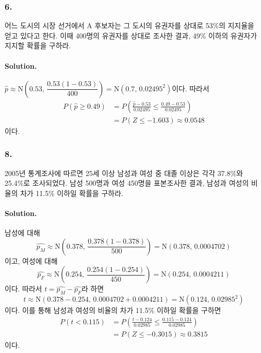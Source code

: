 \subsubsection{6.} 어느 도시의 시장 선거에서 A 후보자는 그 도시의 유권자를 상대로 53\%의 지지율을 얻고 있다고 한다.
이때 400명의 유권자를 상대로 조사한 결과, 49\% 이하의 유권자가 지지할 확률을 구하라.

\paragraph{Solution.} $\hat{p} \approx \mathrm{N}\left(0.53,\,\dfrac{0.53\left(1-0.53\right)}{400}\right) = \mathrm{N}\left(0.7,\,0.02495^2\right)$이다.
따라서
\begin{align*}
    P\left(\hat{p}\geq 0.49\right) &= P\left(\frac{\hat{p}-0.53}{0.02495} \leq \frac{0.49-0.53}{0.02495}\right) \\
    &= P\left(Z \leq -1.603\right) \approx 0.0548
\end{align*}
이다.

\subsubsection{8.} 2005년 통계조사에 따르면 25세 이상 남성과 여성 중 대졸 이상은 각각 37.8\%와 25.4\%로 조사되었다.
남성 500명과 여성 450명을 표본조사한 결과, 남성과 여성의 비율의 차가 11.5\% 이하일 확률을 구하라.

\paragraph{Solution.} 남성에 대해
\[\hat{p_M} \approx \mathrm{N}\left(0.378,\,\dfrac{0.378\left(1-0.378\right)}{500}\right) = \mathrm{N}\left(0.378,\,0.0004702\right)\]
이고, 여성에 대해
\[\hat{p_F} \approx \mathrm{N}\left(0.254,\,\dfrac{0.254\left(1-0.254\right)}{450}\right) = \mathrm{N}\left(0.254,\,0.0004211\right)\]
이다. 따라서 $t=\hat{p_M}-\hat{p_F}$라 하면
\[t \approx \mathrm{N}\left(0.378-0.254,\,0.0004702+0.0004211\right)=\mathrm{N}\left(0.124,\,0.02985^2\right)\]
이다. 이를 통해 남성과 여성의 비율의 차가 11.5\% 이하일 확률을 구하면
\begin{align*}
    P\left(t<0.115\right) &= P\left(\frac{t-0.124}{0.02985} \leq \frac{0.115-0.124}{0.02985}\right) \\
    &= P\left(Z \leq -0.3015\right) \approx 0.3815
\end{align*}
이다.